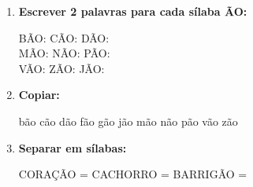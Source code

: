\begin{exercicio}
\begin{enumerate}[resume]
  \item \textbf{Escrever 2 palavras para cada sílaba ÃO:}
  \begin{center}
  BÃO: \underline{\hspace{3cm}} \underline{\hspace{3cm}} \quad CÃO: \underline{\hspace{3cm}} \underline{\hspace{3cm}} \quad DÃO: \underline{\hspace{3cm}} \underline{\hspace{3cm}} \\
  MÃO: \underline{\hspace{3cm}} \underline{\hspace{3cm}} \quad NÃO: \underline{\hspace{3cm}} \underline{\hspace{3cm}} \quad PÃO: \underline{\hspace{3cm}} \underline{\hspace{3cm}} \\
  VÃO: \underline{\hspace{3cm}} \underline{\hspace{3cm}} \quad ZÃO: \underline{\hspace{3cm}} \underline{\hspace{3cm}} \quad JÃO: \underline{\hspace{3cm}} \underline{\hspace{3cm}}
  \end{center}

  \item \textbf{Copiar:}
  \begin{center}
  bão \quad cão \quad dão \quad fão \quad gão \quad jão \quad mão \quad não \quad pão \quad vão \quad zão
  \end{center}

  \item \textbf{Separar em sílabas:}
  \begin{center}
  CORAÇÃO = \underline{\hspace{1cm}} \underline{\hspace{1cm}} \underline{\hspace{1cm}} \quad CACHORRO = \underline{\hspace{1cm}} \underline{\hspace{1cm}} \underline{\hspace{1cm}} \quad BARRIGÃO = \underline{\hspace{1cm}} \underline{\hspace{1cm}} \underline{\hspace{1cm}}
  \end{center}


\end{enumerate}
\end{exercicio}
